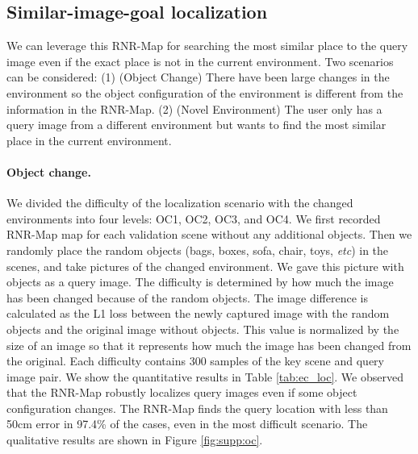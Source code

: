 \documentclass[10pt,twocolumn,letterpaper]{article}
\def\proposed{RNR-Map\xspace}
\def\etc{\emph{etc}\onedot}
\begin{document}
\subsection{Similar-image-goal localization}\label{appendix:exp_loc:sig_loc}

We can leverage this \proposed  for searching the most similar place to the query image even if the exact place is not in the current environment.
%
Two scenarios can be considered: (1) (Object Change) There have been large changes in the environment so the object configuration of the environment is different from the information in the \proposed . 
%
(2) (Novel Environment) The user only has a query image from a different environment but wants to find the most similar place in the current environment.

\paragraph{Object change.} 
We divided the difficulty of the localization scenario with the changed environments into four levels: OC1, OC2, OC3, and OC4.
%
We first recorded \proposed map for each validation scene without any additional objects.
%
Then we randomly place the random objects (bags, boxes, sofa, chair, toys, \etc) in the scenes, and take pictures of the changed environment.
%
We gave this picture with objects as a query image.
%
The difficulty is determined by how much the image has been changed because of the random objects.
%
The image difference is calculated as the L1 loss between the newly captured image with the random objects and the original image without objects. 
%
This value is normalized by the size of an image so that it represents how much the image has been changed from the original.
%
Each difficulty contains 300 samples of the key scene and query image pair.
%
We show the quantitative results in Table \ref{tab:ec_loc}.
%
We observed that the \proposed robustly localizes query images even if some object configuration changes.
%
The \proposed finds the query location with less than 50cm error in 97.4\% of the cases, even in the most difficult scenario.
The qualitative results are shown in Figure \ref{fig:supp:oc}.
%

%
\end{document}
